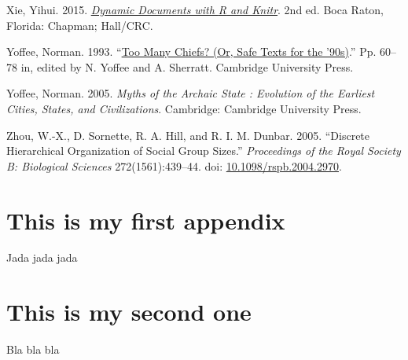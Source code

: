 \documentclass[
  12pt,
]{book}
\newlength{\cslhangindent}
\newlength{\cslentryspacingunit} %
\newenvironment{CSLReferences}[2] %
 {%
  \setlength{\parindent}{0pt}
  \ifodd #1
  \let\oldpar\par
  \def\par{\hangindent=\cslhangindent\oldpar}
  \fi
  \setlength{\parskip}{#2\cslentryspacingunit}
 }%
 {}
\begin{document}
\begin{CSLReferences}{1}{0}
\leavevmode{}%
Xie, Yihui. 2015. \emph{\href{http://yihui.name/knitr/}{Dynamic Documents with {R} and Knitr}}. 2nd ed. Boca Raton, Florida: Chapman; Hall/CRC.

\leavevmode{}%
Yoffee, Norman. 1993. {``\href{https://doi.org/10.1017/CBO9780511720277.007}{Too Many Chiefs? (Or, Safe Texts for the '90s)}.''} Pp. 60--78 in, edited by N. Yoffee and A. Sherratt. Cambridge University Press.

\leavevmode{}%
Yoffee, Norman. 2005. \emph{Myths of the Archaic State : Evolution of the Earliest Cities, States, and Civilizations}. Cambridge: Cambridge University Press.

\leavevmode{}%
Zhou, W.-X., D. Sornette, R. A. Hill, and R. I. M. Dunbar. 2005. {``Discrete Hierarchical Organization of Social Group Sizes.''} \emph{Proceedings of the Royal Society B: Biological Sciences} 272(1561):439--44. doi: \href{https://doi.org/10.1098/rspb.2004.2970}{10.1098/rspb.2004.2970}.

\end{CSLReferences}

\hypertarget{appendix-appendix}{%
\appendix {}}


\hypertarget{this-is-my-first-appendix}{%
\chapter{This is my first appendix}\label{this-is-my-first-appendix}}

Jada jada jada

\hypertarget{this-is-my-second-one}{%
\chapter{This is my second one}\label{this-is-my-second-one}}

Bla bla bla
\end{document}
